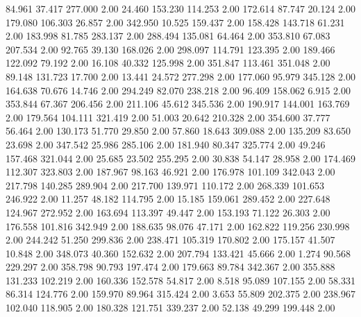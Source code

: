   84.961   37.417  277.000         2.00
  24.460  153.230  114.253         2.00
 172.614   87.747   20.124         2.00
 179.080  106.303   26.857         2.00
 342.950   10.525  159.437         2.00
 158.428  143.718   61.231         2.00
 183.998   81.785  283.137         2.00
 288.494  135.081   64.464         2.00
 353.810   67.083  207.534         2.00
  92.765   39.130  168.026         2.00
 298.097  114.791  123.395         2.00
 189.466  122.092   79.192         2.00
  16.108   40.332  125.998         2.00
 351.847  113.461  351.048         2.00
  89.148  131.723   17.700         2.00
  13.441   24.572  277.298         2.00
 177.060   95.979  345.128         2.00
 164.638   70.676   14.746         2.00
 294.249   82.070  238.218         2.00
  96.409  158.062    6.915         2.00
 353.844   67.367  206.456         2.00
 211.106   45.612  345.536         2.00
 190.917  144.001  163.769         2.00
 179.564  104.111  321.419         2.00
  51.003   20.642  210.328         2.00
 354.600   37.777   56.464         2.00
 130.173   51.770   29.850         2.00
  57.860   18.643  309.088         2.00
 135.209   83.650   23.698         2.00
 347.542   25.986  285.106         2.00
 181.940   80.347  325.774         2.00
  49.246  157.468  321.044         2.00
  25.685   23.502  255.295         2.00
  30.838   54.147   28.958         2.00
 174.469  112.307  323.803         2.00
 187.967   98.163   46.921         2.00
 176.978  101.109  342.043         2.00
 217.798  140.285  289.904         2.00
 217.700  139.971  110.172         2.00
 268.339  101.653  246.922         2.00
  11.257   48.182  114.795         2.00
  15.185  159.061  289.452         2.00
 227.648  124.967  272.952         2.00
 163.694  113.397   49.447         2.00
 153.193   71.122   26.303         2.00
 176.558  101.816  342.949         2.00
 188.635   98.076   47.171         2.00
 162.822  119.256  230.998         2.00
 244.242   51.250  299.836         2.00
 238.471  105.319  170.802         2.00
 175.157   41.507   10.848         2.00
 348.073   40.360  152.632         2.00
 207.794  133.421   45.666         2.00
   1.274   90.568  229.297         2.00
 358.798   90.793  197.474         2.00
 179.663   89.784  342.367         2.00
 355.888  131.233  102.219         2.00
 160.336  152.578   54.817         2.00
   8.518   95.089  107.155         2.00
  58.331   86.314  124.776         2.00
 159.970   89.964  315.424         2.00
   3.653   55.809  202.375         2.00
 238.967  102.040  118.905         2.00
 180.328  121.751  339.237         2.00
  52.138   49.299  199.448         2.00
